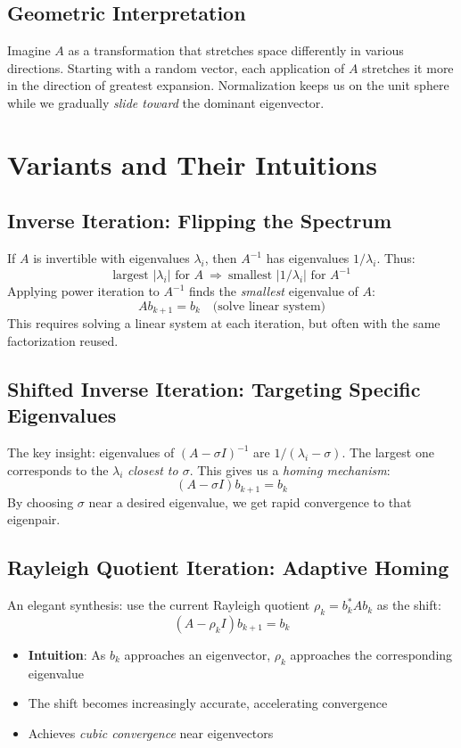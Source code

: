 \documentclass[11pt]{article}
\begin{document}
\subsection{Geometric Interpretation}
Imagine $A$ as a transformation that stretches space differently in various directions. Starting with a random vector, each application of $A$ stretches it more in the direction of greatest expansion. Normalization keeps us on the unit sphere while we gradually \emph{slide toward} the dominant eigenvector.

\section{Variants and Their Intuitions}

\subsection{Inverse Iteration: Flipping the Spectrum}
If $A$ is invertible with eigenvalues $\lambda_i$, then $A^{-1}$ has eigenvalues $1/\lambda_i$. Thus:
\[
\text{largest } |\lambda_i| \text{ for } A \ \Rightarrow\ \text{smallest } |1/\lambda_i| \text{ for } A^{-1}
\]
Applying power iteration to $A^{-1}$ finds the \emph{smallest} eigenvalue of $A$:
\[
A b_{k+1} = b_k \quad \text{(solve linear system)}
\]
This requires solving a linear system at each iteration, but often with the same factorization reused.

\subsection{Shifted Inverse Iteration: Targeting Specific Eigenvalues}
The key insight: eigenvalues of $(A - \sigma I)^{-1}$ are $1/(\lambda_i - \sigma)$. The largest one corresponds to the $\lambda_i$ \emph{closest to $\sigma$}. This gives us a \emph{homing mechanism}:
\[
(A - \sigma I) b_{k+1} = b_k
\]
By choosing $\sigma$ near a desired eigenvalue, we get rapid convergence to that eigenpair.

\subsection{Rayleigh Quotient Iteration: Adaptive Homing}
An elegant synthesis: use the current Rayleigh quotient $\rho_k = b_k^* A b_k$ as the shift:
\[
(A - \rho_k I) b_{k+1} = b_k
\]
\begin{itemize}
\item \textbf{Intuition}: As $b_k$ approaches an eigenvector, $\rho_k$ approaches the corresponding eigenvalue
\item The shift becomes increasingly accurate, accelerating convergence
\item Achieves \emph{cubic convergence} near eigenvectors
\end{itemize}
\end{document}
